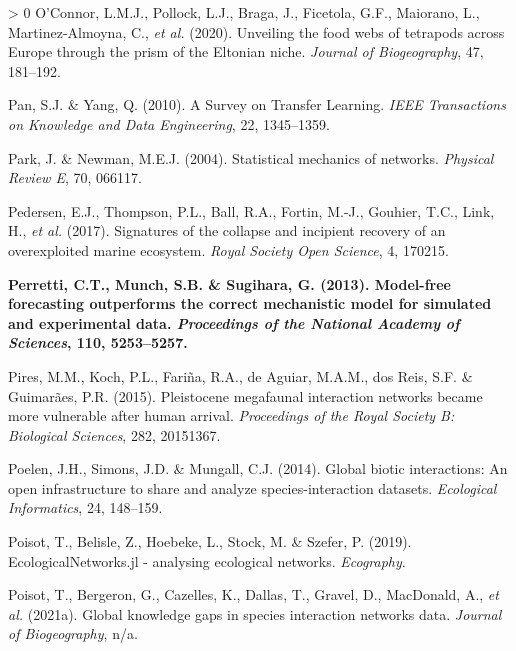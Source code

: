 \documentclass[11pt]{article}
\makeatletter
\def\maxwidth{\ifdim\Gin@nat@width>\linewidth\linewidth
\else\Gin@nat@width\fi}
\let\Oldincludegraphics\includegraphics
\renewcommand{\includegraphics}[1]{\Oldincludegraphics[width=\maxwidth]{#1}}
\newlength{\cslhangindent}
\newenvironment{CSLReferences}[3] %
 {%
  \setlength{\parindent}{0pt}
  \ifodd #1 \everypar{\setlength{\hangindent}{\cslhangindent}}\ignorespaces\fi
  \ifnum #2 > 0
  \setlength{\parskip}{#2\baselineskip}
  \fi
 }%
 {}
\providecommand{\DIFaddtex}[1]{{\bf #1}} %
\providecommand{\DIFaddbegin}{\protect\color{blue}} %
\providecommand{\DIFaddend}{\protect\color{black}} %
\providecommand{\DIFadd}[1]{\texorpdfstring{\DIFaddtex{#1}}{#1}} %
\newcommand{\DIFaddincludegraphics}[2][]{{\color{blue}\fbox{\DIFOincludegraphics[#1]{#2}}}} %
\DeclareRobustCommand{\DIFaddbegin}{\DIFOaddbegin \let\includegraphics\DIFaddincludegraphics} %
\DeclareRobustCommand{\DIFaddend}{\DIFOaddend \let\includegraphics\DIFOincludegraphics} %
\makeatother
\begin{document}
\begin{CSLReferences}{1}{0}
\leavevmode\DIFaddend \hypertarget{ref-OConnor2020UnvFoo}{}%
O'Connor, L.M.J., Pollock, L.J., Braga, J., Ficetola, G.F., Maiorano,
L., Martinez-Almoyna, C., \emph{et al.} (2020). Unveiling the food webs
of tetrapods across Europe through the prism of the Eltonian niche.
\emph{Journal of Biogeography}, 47, 181--192.

\leavevmode\hypertarget{ref-Pan2010SurTra}{}%
Pan, S.J. \& Yang, Q. (2010). A Survey on Transfer Learning. \emph{IEEE
Transactions on Knowledge and Data Engineering}, 22, 1345--1359.

\leavevmode\hypertarget{ref-Park2004StaMec}{}%
Park, J. \& Newman, M.E.J. (2004). Statistical mechanics of networks.
\emph{Physical Review E}, 70, 066117.

\leavevmode\hypertarget{ref-Pedersen2017SigCol}{}%
Pedersen, E.J., Thompson, P.L., Ball, R.A., Fortin, M.-J., Gouhier,
T.C., Link, H., \emph{et al.} (2017). Signatures of the collapse and
incipient recovery of an overexploited marine ecosystem. \emph{Royal
Society Open Science}, 4, 170215.

\leavevmode\DIFaddbegin \hypertarget{ref-Perretti2013ModFor}{}%
\DIFadd{Perretti, C.T., Munch, S.B. \& Sugihara, G. (2013). Model-free
forecasting outperforms the correct mechanistic model for simulated and
experimental data. \emph{Proceedings of the National Academy of
Sciences}, 110, 5253--5257.
}

\leavevmode\DIFaddend \hypertarget{ref-Pires2015PleMeg}{}%
Pires, M.M., Koch, P.L., Fariña, R.A., de Aguiar, M.A.M., dos Reis, S.F.
\& Guimarães, P.R. (2015). Pleistocene megafaunal interaction networks
became more vulnerable after human arrival. \emph{Proceedings of the
Royal Society B: Biological Sciences}, 282, 20151367.

\leavevmode\hypertarget{ref-Poelen2014GloBio}{}%
Poelen, J.H., Simons, J.D. \& Mungall, C.J. (2014). Global biotic
interactions: An open infrastructure to share and analyze
species-interaction datasets. \emph{Ecological Informatics}, 24,
148--159.

\leavevmode\hypertarget{ref-Poisot2019EcoJl}{}%
Poisot, T., Belisle, Z., Hoebeke, L., Stock, M. \& Szefer, P. (2019).
EcologicalNetworks.jl - analysing ecological networks. \emph{Ecography}.

\leavevmode\hypertarget{ref-Poisot2021GloKno}{}%
Poisot, T., Bergeron, G., Cazelles, K., Dallas, T., Gravel, D.,
MacDonald, A., \emph{et al.} (2021a). Global knowledge gaps in species
interaction networks data. \emph{Journal of Biogeography}, n/a.


\end{CSLReferences}
\end{document}
